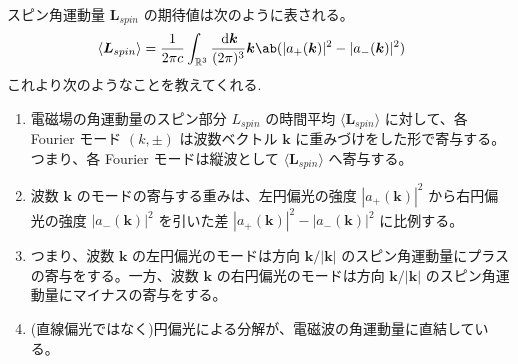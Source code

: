 \documentclass[uplatex,dvipdfmx,a4paper,11pt]{jlreq}
\newcommand{\RR}{\mathbb{R}}
\newcommand{\kk}{\bm{k}}
\newcommand{\LL}{\bm{L}}
\theoremstyle{definition}
\begin{document}
\begin{theorem}
  スピン角運動量 $\LL_{spin}$ の期待値は次のように表される。
  \begin{align}
    \langle\LL_{spin}\rangle & = \frac{1}{2\pi c}\int_{\RR^3}\frac{\dl{\kk}}{(2\pi)^3}\kk\ab(|a_+(\kk)|^2 - |a_-(\kk)|^2)
  \end{align}
  これより次のようなことを教えてくれる.
  \begin{enumerate}
    \item 電磁場の角運動量のスピン部分 $L_{spin}$ の時間平均 $\langle\LL_{spin}\rangle$ に対して、各 Fourier モード $(k, \pm)$ は波数ベクトル $\kk$ に重みづけをした形で寄与する。つまり、各 Fourier モードは縦波として $\langle\LL_{spin}\rangle$ へ寄与する。
    \item 波数 $\kk$ のモードの寄与する重みは、左円偏光の強度 $|a_+(\kk)|^2$ から右円偏光の強度 $|a_-(\kk)|^2$ を引いた差 $|a_+(\kk)|^2 - |a_-(\kk)|^2$ に比例する。
    \item つまり、波数 $\kk$ の左円偏光のモードは方向 $\kk/|\kk|$ のスピン角運動量にプラスの寄与をする。一方、波数 $\kk$ の右円偏光のモードは方向 $\kk/|\kk|$ のスピン角運動量にマイナスの寄与をする。
    \item (直線偏光ではなく)円偏光による分解が、電磁波の角運動量に直結している。
  \end{enumerate}
\end{theorem}
\end{document}
